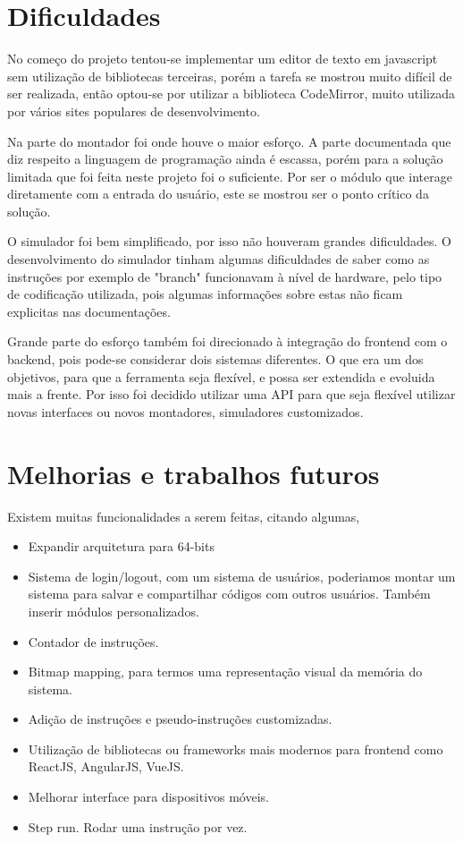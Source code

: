 \section{Dificuldades}

	No começo do projeto tentou-se implementar um editor de texto em javascript sem utilização de bibliotecas terceiras, porém a tarefa se mostrou muito difícil de ser realizada, então optou-se por utilizar a biblioteca CodeMirror, muito utilizada por vários sites populares de desenvolvimento.

	Na parte do montador foi onde houve o maior esforço. A parte documentada que diz respeito a linguagem de programação ainda é escassa, porém para a solução limitada que foi feita neste projeto foi o suficiente. Por ser o módulo que interage diretamente com a entrada do usuário, este se mostrou ser o ponto crítico da solução.

	O simulador foi bem simplificado, por isso não houveram grandes dificuldades. O desenvolvimento do simulador tinham algumas dificuldades de saber como as instruções por exemplo de "branch" funcionavam à nível de hardware, pelo tipo de codificação utilizada, pois algumas informações sobre estas não ficam explicitas nas documentações.

	Grande parte do esforço também foi direcionado à integração do frontend com o backend, pois pode-se considerar dois sistemas diferentes. O que era um dos objetivos, para que a ferramenta seja flexível, e possa ser extendida e evoluida mais a frente. Por isso foi decidido utilizar uma API para que seja flexível utilizar novas interfaces ou novos montadores, simuladores customizados.

\section{Melhorias e trabalhos futuros}

	Existem muitas funcionalidades a serem feitas, citando algumas,

	\begin{itemize}
		\item Expandir arquitetura para 64-bits
		\item Sistema de login/logout, com um sistema de usuários, poderiamos montar um sistema para salvar e compartilhar códigos com outros usuários. Também inserir módulos personalizados.
		\item Contador de instruções.
		\item Bitmap mapping, para termos uma representação visual da memória do sistema.
		\item Adição de instruções e pseudo-instruções customizadas.
		\item Utilização de bibliotecas ou frameworks mais modernos para frontend como ReactJS, AngularJS, VueJS.
		\item Melhorar interface para dispositivos móveis.
		\item Step run. Rodar uma instrução por vez.
	\end{itemize}

